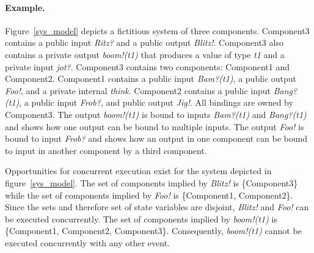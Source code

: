 \paragraph{Example.}
Figure~\ref{sys_model} depicts a fictitious system of three components.
Component3 contains a public input \emph{Ritz?} and a public output \emph{Blitz!}.
Component3 also contains a private output \emph{boom!(t1)} that produces a value of type \emph{t1} and a private input \emph{jot?}.
Component3 contains two components: Component1 and Component2.
Component1 contains a public input \emph{Bam?(t1)}, a public output \emph{Foo!}, and a private internal \emph{think}.
Component2 contains a public input \emph{Bang?(t1)}, a public input \emph{Frob?}, and public output \emph{Jig!}.
All bindings are owned by Component3.
The output \emph{boom!(t1)} is bound to inputs \emph{Bam?(t1)} and \emph{Bang?(t1)} and shows how one output can be bound to multiple inputs.
The output \emph{Foo!} is bound to input \emph{Frob?} and shows how an output in one component can be bound to input in another component by a third component.

Opportunities for concurrent execution exist for the system depicted in figure~\ref{sys_model}.
The set of components implied by \emph{Blitz!} is \{Component3\} while the set of components implied by \emph{Foo!} is \{Component1, Component2\}.
Since the sets and therefore set of state variables are disjoint, \emph{Blitz!} and \emph{Foo!} can be executed concurrently.
The set of components implied by \emph{boom!(t1)} is \{Component1, Component2, Component3\}.
Consequently, \emph{boom!(t1)} cannot be executed concurrently with any other event.



